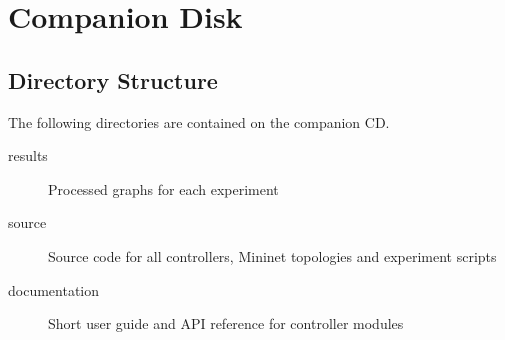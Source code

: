 \chapter{Companion Disk}

\section{Directory Structure}

The following directories are contained on the companion CD.

\begin{description}
\item[results]
Processed graphs for each experiment
\item[source]
Source code for all controllers, Mininet topologies and experiment scripts
\item[documentation]
Short user guide and API reference for controller modules
\end{description}
